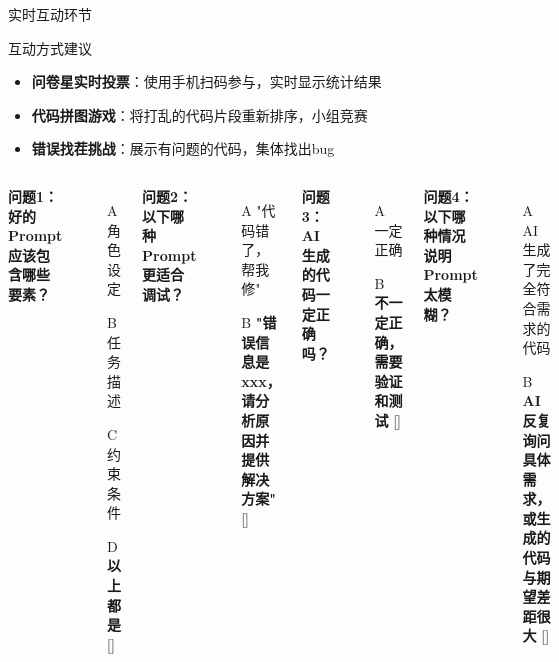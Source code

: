 \begin{frame}{实时互动环节}
	\begin{exampleblock}{互动方式建议}
		\begin{itemize}
			\item \textbf{问卷星实时投票}：使用手机扫码参与，实时显示统计结果
			\item \textbf{代码拼图游戏}：将打乱的代码片段重新排序，小组竞赛
			\item \textbf{错误找茬挑战}：展示有问题的代码，集体找出bug
		\end{itemize}
	\end{exampleblock}

	\vspace{0.3cm}

	\begin{columns}
		\textbf{问题1：好的Prompt应该包含哪些要素？}
		\begin{itemize}
			\item[A] 角色设定
			\item[B] 任务描述
			\item[C] 约束条件
			\item[D] \textbf{以上都是} [\checkmark]
		\end{itemize}

		\vspace{0.3cm}

		\textbf{问题2：以下哪种Prompt更适合调试？}
		\begin{itemize}
			\item[A] "代码错了，帮我修"
			\item[B] \textbf{"错误信息是xxx，请分析原因并提供解决方案"} [\checkmark]
		\end{itemize}

		\textbf{问题3：AI生成的代码一定正确吗？}
		\begin{itemize}
			\item[A] 一定正确
			\item[B] \textbf{不一定正确，需要验证和测试} [\checkmark]
		\end{itemize}

		\vspace{0.3cm}

		\textbf{问题4：以下哪种情况说明Prompt太模糊？}
		\begin{itemize}
			\item[A] AI生成了完全符合需求的代码
			\item[B] \textbf{AI反复询问具体需求，或生成的代码与期望差距很大} [\checkmark]
		\end{itemize}
	\end{columns}

	\vspace{0.5cm}

	\begin{center}
	\end{center}
\end{frame}

